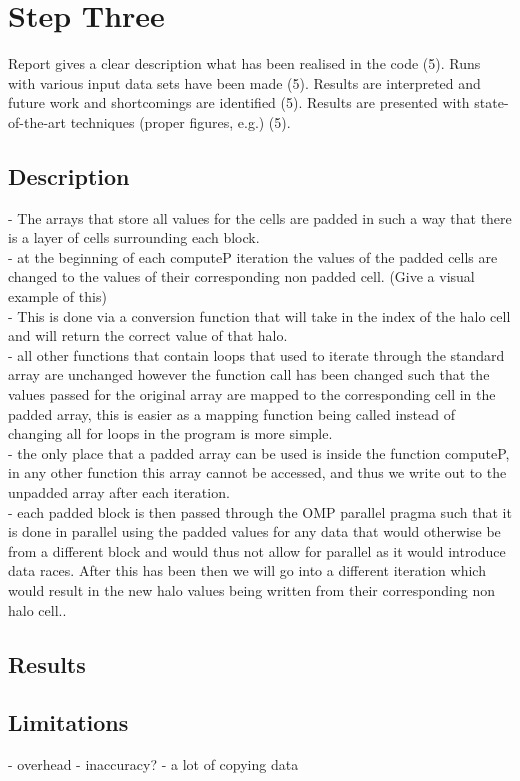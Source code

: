 \documentclass[paper=a4, fontsize=11pt]{scrartcl}
\numberwithin{equation}{section}		%
\numberwithin{figure}{section}			%
\numberwithin{table}{section}				%
\begin{document}
\section{Step Three}
Report gives a clear description what has been realised in the code (5). Runs with various input data sets have been made (5). Results are interpreted and future work and shortcomings are identified (5). Results are presented with state-of-the-art techniques (proper figures, e.g.) (5).
\subsection{Description}

- The arrays that store all values for the cells are padded in such a way that there is a layer of cells surrounding each block.\\
- at the beginning of each computeP iteration the values of the padded cells are changed to the values of their corresponding non padded cell. (Give a visual example of this)\\
- This is done via a conversion function that will take in the index of the halo cell and will return the correct value of that halo.\\
- all other functions that contain loops that used to iterate through the standard array are unchanged however the function call has been changed such that the values passed for the original array are mapped to the corresponding cell in the padded array, this is easier as a mapping function being called instead of changing all for loops in the program is more simple.\\
- the only place that a padded array can be used is inside the function computeP, in any other function this array cannot be accessed, and thus we write out to the unpadded array after each iteration.\\
- each padded block is then passed through the OMP parallel pragma such that it is done in parallel using the padded values for any data that would otherwise be from a different block and would thus not allow for parallel as it would introduce data races. After this has been then we will go into a different iteration which would result in the new halo values being written from their corresponding non halo cell.. 

\subsection{Results}

\subsection{Limitations}

- overhead
- inaccuracy?
- a lot of copying data

\end{document}

